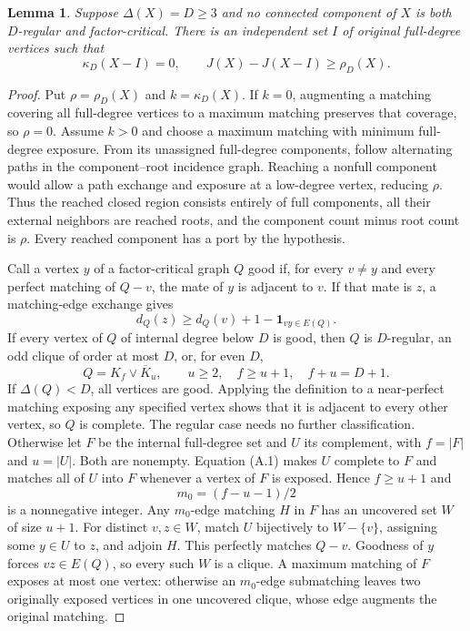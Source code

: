 \documentclass[11pt,a4paper]{article}
\newtheorem{lemma}[theorem]{Lemma}
\theoremstyle{definition}
\begin{document}
\begin{lemma}\label{lem:ported-reserve}
Suppose $\Delta(X)=D\ge3$ and no connected component of $X$ is both $D$-regular and factor-critical. There is an independent set $I$ of original full-degree vertices such that
\[
\kappa_D(X-I)=0,\qquad J(X)-J(X-I)\ge\rho_D(X).
\]
\end{lemma}
\begin{proof}
Put $\rho=\rho_D(X)$ and $k=\kappa_D(X)$. If $k=0$, augmenting a matching covering all full-degree vertices to a maximum matching preserves that coverage, so $\rho=0$. Assume $k>0$ and choose a maximum matching with minimum full-degree exposure. From its unassigned full-degree components, follow alternating paths in the component--root incidence graph. Reaching a nonfull component would allow a path exchange and exposure at a low-degree vertex, reducing $\rho$. Thus the reached closed region consists entirely of full components, all their external neighbors are reached roots, and the component count minus root count is $\rho$. Every reached component has a port by the hypothesis.

Call a vertex $y$ of a factor-critical graph $Q$ good if, for every $v\ne y$ and every perfect matching of $Q-v$, the mate of $y$ is adjacent to $v$. If that mate is $z$, a matching-edge exchange gives
\[
d_Q(z)\ge d_Q(v)+1-\mathbf1_{vy\in E(Q)}. \tag{A.1}
\]
If every vertex of $Q$ of internal degree below $D$ is good, then $Q$ is $D$-regular, an odd clique of order at most $D$, or, for even $D$,
\[
Q=K_f\vee\overline K_u,\qquad u\ge2,\quad f\ge u+1,\quad f+u=D+1.
\]
If $\Delta(Q)<D$, all vertices are good. Applying the definition to a near-perfect matching exposing any specified vertex shows that it is adjacent to every other vertex, so $Q$ is complete. The regular case needs no further classification. Otherwise let $F$ be the internal full-degree set and $U$ its complement, with $f=|F|$ and $u=|U|$. Both are nonempty. Equation (A.1) makes $U$ complete to $F$ and matches all of $U$ into $F$ whenever a vertex of $F$ is exposed. Hence $f\ge u+1$ and
\[
m_0=(f-u-1)/2
\]
is a nonnegative integer. Any $m_0$-edge matching $H$ in $F$ has an uncovered set $W$ of size $u+1$. For distinct $v,z\in W$, match $U$ bijectively to $W-\{v\}$, assigning some $y\in U$ to $z$, and adjoin $H$. This perfectly matches $Q-v$. Goodness of $y$ forces $vz\in E(Q)$, so every such $W$ is a clique. A maximum matching of $F$ exposes at most one vertex: otherwise an $m_0$-edge submatching leaves two originally exposed vertices in one uncovered clique, whose edge augments the original matching.


\end{proof}
\end{document}
